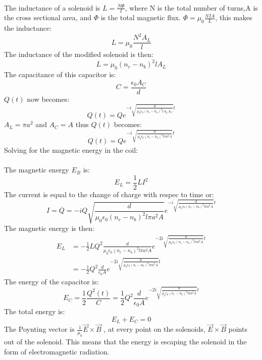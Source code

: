 \documentclass[a4paper,12pt]{article}
\newcommand{\V}[1]{\ensuremath{\vec{#1}}}
\newcommand{\F}[2]{\ensuremath{\frac{#1}{#2}}}
\newcommand{\vel}[1]{\overset{.}{#1}}
\begin{document}
\\
The inductance of a solenoid is $L=\F{N\Phi}{I}$, where N is the total number of turns,A is the cross sectional area, and $\Phi$ is the total magnetic flux.  $\Phi=\mu_0\F{NIA}{L}$, this makes the inductance:
\[L=\mu_0\F{N^2A_L}{l}\]
The inductance of the modified solenoid is then:
\[L= \mu_0(n_r-n_b)^2lA_L\]
The capacitance of this capacitor is:
\[C=\F{\epsilon_0A_C}{d}\]
$Q(t)$ now becomes:
\[Q(t)=Qe^{-i\sqrt{\F{d}{\mu_0\epsilon_0(n_r-n_b)^2lA_LA_C}}t}\]
$A_L=\pi a^2$ and $A_C=A$ thus $Q(t)$ becomes:
\[Q(t)=Qe^{-i\sqrt{\F{d}{\mu_0\epsilon_0(n_r-n_b)^2l\pi a^2A}}t}\]
Solving for the magnetic energy in the coil:\\ 
\\
The magnetic energy $E_B$ is:
\[E_L=\F{1}{2}LI^2\]
The current is equal to the change of charge with respec to time or:
\[I=\vel{Q}=-iQ\sqrt{\F{d}{\mu_0\epsilon_0(n_r-n_b)^2l\pi a^2A}}e^{-i\sqrt{\F{d}{\mu_0\epsilon_0(n_r-n_b)^2l\pi a^2A}}t}\]
The magnetic energy is then:
\begin{align*}
E_L&=-\F{1}{2}LQ^2\F{d}{\mu_0\epsilon_0(n_r-n_b)^2l\pi a^2A}e^{-2i\sqrt{\F{d}{\mu_0\epsilon_0(n_r-n_b)^2l\pi a^2A}}t}\\
&=-\F{1}{2}Q^2\F{d}{\epsilon_0A}e^{-2i\sqrt{\F{d}{\mu_0\epsilon_0(n_r-n_b)^2l\pi a^2A}}t}
\end{align*}
The energy of the capacitor is:
\[E_C=\F{1}{2}\F{Q^2(t)}{C}=\F{1}{2}Q^2\F{d}{\epsilon_0A}e^{-2i\sqrt{\F{d}{\mu_0\epsilon_0(n_r-n_b)^2l\pi a^2A}}t}\]
The total energy is:
\[E_L+E_C=0\]
The  Poynting vector is $\F{1}{\mu_0}\V{E}\times\V{B}$ , at every point on the solenoids, $\V{E}\times\V{B}$ points out of the solenoid.  This means that the energy is escaping the solenoid in the form of electromagnetic radiation.
\end{document}
